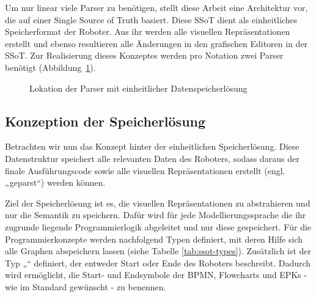 Um nur linear viele Parser zu benötigen, stellt diese Arbeit eine Architektur vor, die auf einer Single Source of Truth basiert. Diese SSoT dient als einheitliches Speicherformat der Roboter. Aus ihr werden alle visuellen Repräsentationen erstellt und ebenso resultieren alle Änderungen in den grafischen Editoren in der SSoT. Zur Realisierung dieses Konzeptes werden pro Notation zwei Parser benötigt (\mbox{Abbildung \ref{fig:parser3}).}

\begin{figure}[h!]
    \centering
    \caption{Lokation der Parser mit einheitlicher Datenspeicherlösung}
    \label{fig:parser3}
\end{figure}

\clearpage

\subsection{Konzeption der Speicherlösung}

Betrachten wir nun das Konzept hinter der einheitlichen Speicherlösung. Diese Datenstruktur speichert alle relevanten Daten des Roboters, sodass daraus der finale Ausführungscode sowie alle visuellen Repräsentationen erstellt (engl. „geparst“) werden können.

Ziel der Speicherlösung ist es, die visuellen Repräsentationen zu abstrahieren und nur die Semantik zu speichern. Dafür wird für jede Modellierungssprache die ihr zugrunde liegende Programmierlogik abgeleitet und nur diese gespeichert. 
Für die Programmierkonzepte werden nachfolgend Typen definiert, mit deren Hilfe sich alle Graphen abspeichern lassen (siehe Tabelle \ref{tab:ssot-types}). Zusätzlich ist der Typ „“ definiert, der entweder Start oder Ende des Roboters beschreibt. Dadurch wird ermöglicht, die Start- und Endsymbole der BPMN, Flowcharts und EPKs - wie im Standard gewünscht - zu benennen. 

